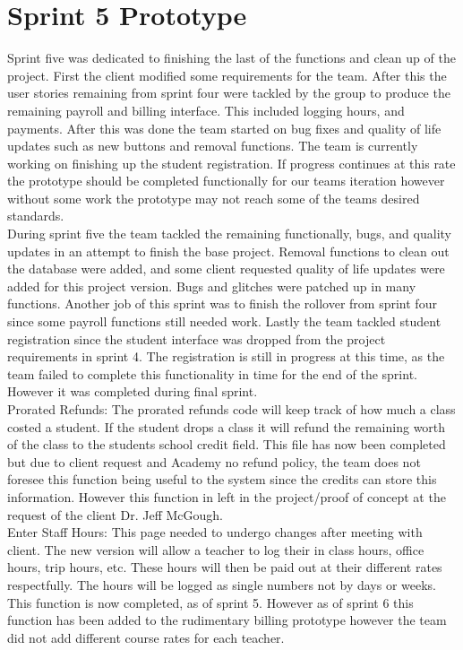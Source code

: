 \section{Sprint 5 Prototype}
Sprint five was dedicated to finishing the last of the functions and clean up of the project. First the client modified  some requirements for the team. After this the user stories remaining from sprint four were tackled by the group to produce the remaining payroll and billing interface. This included logging hours, and payments. After this was done the team started on bug fixes and quality of life updates such as new buttons and removal functions. The team is currently working on finishing up the student registration. If progress continues at this rate the prototype should be completed functionally for our teams iteration however without some work the prototype may not reach some of the teams desired standards.\\

During sprint five the team tackled the remaining functionally, bugs, and quality updates in an attempt to finish the base project. Removal functions to clean out the database were added, and some client requested quality of life updates were added for this project version. Bugs and glitches were patched up in many functions. Another job of this sprint was to finish the rollover from sprint four since some payroll functions still needed work. Lastly the team tackled student registration since the student interface was dropped from the project requirements in sprint 4. The registration is still in progress at this time, as the team failed to complete this functionality in time for the end of the sprint. However it was completed during final sprint.\\

Prorated Refunds:
The prorated refunds code will keep track of how much a class costed a student. If the student drops a class it will refund the remaining worth of the class to the students school credit field. This file has now been completed but due to client request and Academy no refund policy, the team does not foresee this function being useful to the system since the credits can store this information. However this function in left in the project/proof of concept at the request of the client Dr. Jeff McGough.\\

Enter Staff Hours:
This page needed to undergo changes after meeting with client. The new version will allow a teacher to log their in class hours, office hours, trip hours, etc. These hours will then be paid out at their different rates respectfully. The hours will be logged as single numbers not by days or weeks. This function is now completed, as of sprint 5. However as of sprint 6 this function has been added to the rudimentary billing prototype however the team did not add different course rates for each teacher.\\

